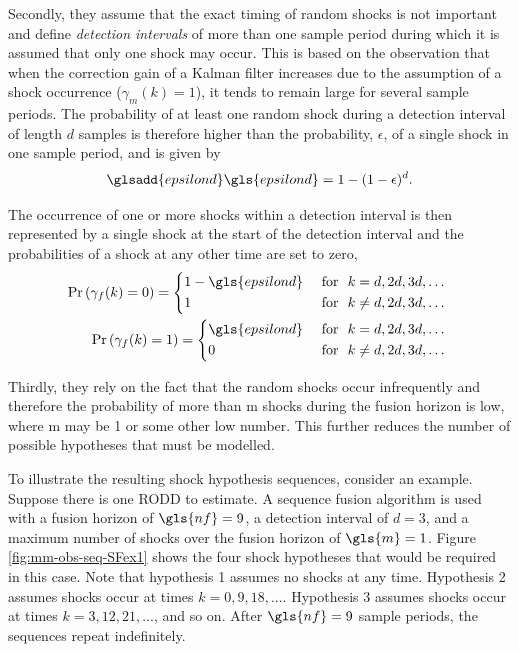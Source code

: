 Secondly, they assume that the exact timing of random shocks is not important and define \textit{detection intervals} of more than one sample period during which it is assumed that only one shock may occur. This is based on the observation that when the correction gain of a Kalman filter increases due to the assumption of a shock occurrence ($\gamma_m(k)=1$), it tends to remain large for several sample periods. The probability of at least one random shock during a detection interval of length $d$ samples is therefore higher than the probability, $\epsilon$, of a single shock in one sample period, and is given by
\begin{equation}  \label{eq:p_gamma_d}
	\glsadd{epsilond}\gls{epsilond} = 1 - (1 - \epsilon)^{d}.
\end{equation}

The occurrence of one or more shocks within a detection interval is then represented by a single shock at the start of the detection interval and the probabilities of a shock at any other time are set to zero,
\begin{equation} \label{eq:Pr_gamma_nd}
	\begin{aligned}
		\Pr\left(\gamma_{f}(k)=0\right) = \begin{cases*}
			1 - \gls{epsilond} & \text { for } $k = d, 2d, 3d, \ldots$ \\
			1 & \text { for } $k \ne d, 2d, 3d, \ldots$
		\end{cases*} \\
		\Pr\left(\gamma_{f}(k)=1\right) = \begin{cases*}
			\gls{epsilond} & \text { for } $k = d, 2d, 3d, \ldots$ \\
			0 & \text { for } $k \ne d, 2d, 3d, \ldots$
		\end{cases*} \\
	\end{aligned}
\end{equation}

Thirdly, they rely on the fact that the random shocks occur infrequently and therefore the probability of more than \gls{m} shocks during the fusion horizon is low, where \gls{m} may be 1 or some other low number. This further reduces the number of possible hypotheses that must be modelled.

To illustrate the resulting shock hypothesis sequences, consider an example. Suppose there is one \gls{RODD} to estimate. A sequence fusion algorithm is used with a fusion horizon of $\gls{nf}=9$, a detection interval of $d=3$, and a maximum number of shocks over the fusion horizon of $\gls{m}=1$. Figure \ref{fig:mm-obs-seq-SFex1} shows the four shock hypotheses that would be required in this case. Note that hypothesis 1 assumes no shocks at any time. Hypothesis 2 assumes shocks occur at times $k=0,9,18,...$. Hypothesis 3 assumes shocks occur at times $k=3,12,21,...$, and so on. After $\gls{nf}=9$ sample periods, the sequences repeat indefinitely.

